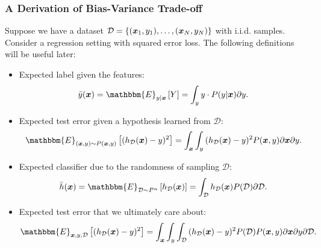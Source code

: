     \subsubsection{A Derivation of Bias-Variance Trade-off}
        Suppose we have a dataset $\mathcal{D}=\{ (\bm{x}_1, y_1), \ldots, (\bm{x}_N, y_N) \}$ with i.i.d. samples.
        Consider a regression setting with squared error loss.
        The following definitions will be useful later:
            \begin{itemize}
                \item Expected label given the features: 
                    \begin{equation}
                        \bar{y}(\bm{x}) = \mathbbm{E}_{y | \bm{x}}\left[ Y \right] = \int_{y}^{}{ y \cdot P(y | \bm{x}) \partial y}.
                    \end{equation}
                \item Expected test error given a hypothesis learned from $\mathcal{D}$:
                    \begin{equation}
                        \mathbbm{E}_{(\bm{x}, y) \sim P(\bm{x}, y)}\left[ (h_{\mathcal{D}}(\bm{x}) - y )^2 \right] = \int_{\bm{x}}^{}{ \int_{y}^{}{ (h_{\mathcal{D}}(\bm{x}) - y )^2 P(\bm{x}, y)   }     \partial \bm{x} \partial y}.
                    \end{equation}
                \item Expected classifier due to the randomness of sampling $\mathcal{D}$:
                    \begin{equation}
                        \bar{h}(\bm{x}) = \mathbbm{E}_{\mathcal{D} \sim P^n}\left[ h_{\mathcal{D}}(\bm{x}) \right] = \int_{\mathcal{D}}^{}{ h_{\mathcal{D}}(\bm{x})P(\mathcal{D}) \partial \mathcal{D}}.
                    \end{equation}
                \item Expected test error that we ultimately care about: 
                    \begin{equation}\label{eq:bias-var-gen}
                        \mathbbm{E}_{\bm{x}, y, \mathcal{D}}\left[ (h_{\mathcal{D}}(\bm{x}) - y )^2 \right] = \int_{\bm{x}}^{}{\int_{y}^{}{\int_{\mathcal{D}}^{}{        (h_{\mathcal{D}}(\bm{x}) - y )^2 P(\mathcal{D})P(\bm{x}, y) \partial \bm{x} \partial y \partial \mathcal{D}
                        }}}.
                    \end{equation}
            \end{itemize}
            
